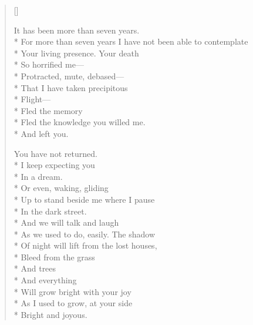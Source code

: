 \label{ch:the_nature_of_loss}
\settowidth{\versewidth}{For more than seven years I have not been able to contemplate}
\begin{verse}[\versewidth]

It has been more than seven years.\\*
For more than seven years I have not been able to contemplate\\*
Your living presence.   Your death\\*
So horrified me---\\*
Protracted, mute, debased---\\*
That I have taken precipitous \\*
Flight---\\*
Fled the memory\\*
Fled the knowledge you willed me.\\*
And left you.

You have not returned.\\*
I keep expecting you\\*
In a dream.\\*
Or even, waking, gliding\\*
Up to stand beside me where I pause\\*
In the dark street.\\*
And we will talk and laugh\\*
As we used to do, easily.  The shadow\\*
Of night will lift from the lost houses,\\*
Bleed from the grass\\*
And trees\\*
And everything\\*
Will grow bright with your joy \\*
As I used to grow, at your side\\*
Bright and joyous.
\end{verse}
